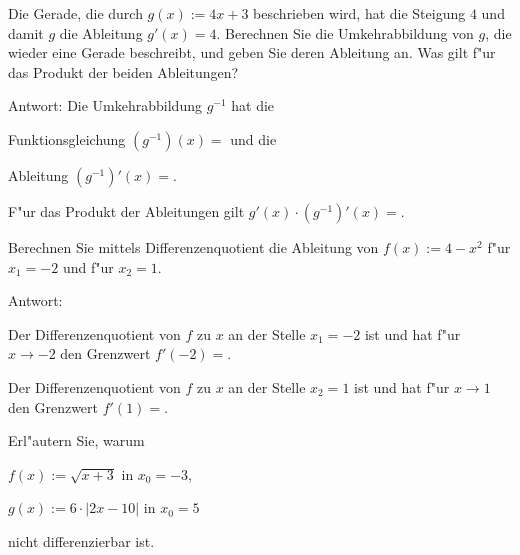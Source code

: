  

\begin{MExercises}


\begin{MExercise}
Die Gerade, die durch $g(x) := 4 x + 3$ beschrieben wird, hat die 
Steigung $4$ und damit $g$ die Ableitung $g'(x) = 4$.
Berechnen Sie die Umkehrabbildung von $g$, die wieder eine Gerade beschreibt,
und geben Sie deren Ableitung an. Was gilt f"ur das Produkt der beiden 
Ableitungen?

Antwort: Die Umkehrabbildung $g^{-1}$ hat die 
\begin{MExerciseItems}
\item Funktionsgleichung
 $(g^{-1})(x) = $ und die 
\item Ableitung
 $(g^{-1})'(x) =$.
\end{MExerciseItems}
F"ur das Produkt der Ableitungen gilt
 $g'(x) \cdot (g^{-1})'(x) =$.
\end{MExercise}


\begin{MExercise}
Berechnen Sie mittels Differenzenquotient die Ableitung von 
$f(x) := 4 - x^2$ f"ur $x_1 = -2$ und f"ur $x_2 = 1$.

Antwort: 
\begin{MExerciseItems}
\item Der Differenzenquotient von $f$ zu $x$ an der Stelle $x_1 = -2$ ist
und hat f"ur $x \to -2$ den Grenzwert
 $f'(-2) = $.
\item Der Differenzenquotient von $f$ zu $x$ an der Stelle $x_2 = 1$ ist
und hat f"ur $x \to 1$ den Grenzwert
 $f'(1) = $.
\end{MExerciseItems}
\end{MExercise}


\begin{MExercise}
Erl"autern Sie, warum
\begin{MExerciseItems}
\item $f(x) := \sqrt{x+3}$ in $x_0 = -3$,
\item $g(x) := 6 \cdot |2 x - 10|$ in $x_0 = 5$
\end{MExerciseItems}
nicht differenzierbar ist.


\end{MExercise}
\end{MExercises}
